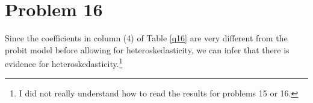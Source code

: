 \documentclass[11pt]{article}
\begin{document}
\section*{Problem 16}
Since the coefficients in column (4) of Table \ref{q16} are very different from the probit model before allowing for heteroskedasticity, we can infer that there is evidence for heteroskedasticity.\footnote{I did not really understand how to read the results for problems 15 or 16.}

\end{document}
